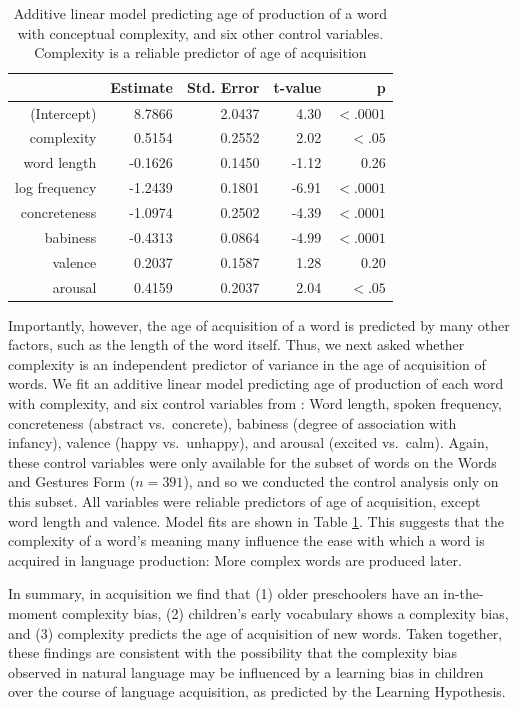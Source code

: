 \begin{table}[t!]
\centering
\begin{tabular}{rrrrr}
  \hline
 & Estimate & Std. Error & t-value & p\\ 
  \hline
(Intercept) & 8.7866 & 2.0437 & 4.30 & $<.0001$ \\ 
  complexity & 0.5154 & 0.2552 & 2.02 & $<.05$ \\ 
  word length & -0.1626 & 0.1450 & -1.12 & 0.26\\ 
  log frequency  & -1.2439 & 0.1801 & -6.91 & $<.0001$ \\ 
  concreteness & -1.0974 & 0.2502 & -4.39 & $<.0001$\\ 
  babiness & -0.4313 & 0.0864 & -4.99 &$<.0001$\\ 
  valence & 0.2037 & 0.1587 & 1.28 & 0.20 \\ 
  arousal & 0.4159 & 0.2037 & 2.04 &$ <.05$ \\ 
   \hline
\end{tabular}
\caption{Additive linear model predicting age of production of a word with conceptual complexity, and six other control variables. Complexity is a reliable predictor of age of acquisition}
  \label{tab:aoapred}
\end{table}

Importantly, however, the age of acquisition of a word is predicted by many other factors, such as the length of the word itself. Thus, we next asked whether complexity is an independent predictor of variance in the age of acquisition of words. We fit an additive linear model predicting age of production of each word with complexity, and six control variables from : Word length, spoken frequency, concreteness (abstract vs.\ concrete), babiness (degree of association with infancy), valence (happy vs.\ unhappy), and arousal (excited vs.\ calm).  Again, these control variables were only available for the subset of words on the Words and Gestures Form ($n = 391$), and so we conducted the control analysis only on this subset. All variables were reliable predictors of age of acquisition, except word length and valence. Model fits are shown in Table \ref{tab:aoapred}. This suggests that the complexity of a word's meaning many influence the ease with which a word is acquired in language production: More complex words are produced later.

In summary, in acquisition we find that (1) older preschoolers have an in-the-moment complexity bias, (2) children's early vocabulary shows a complexity bias, and (3) complexity predicts the age of acquisition of new words. Taken together, these findings are consistent with the possibility that the  complexity bias observed in natural language may be influenced by a learning bias in children over the course of language acquisition, as predicted by the Learning Hypothesis. 


